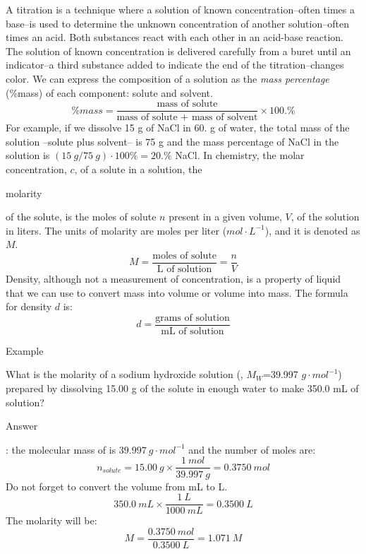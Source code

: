 \documentclass[main.tex]{subfiles}
\begin{document}
\vspace{0.2cm}{\large \bfseries Background}
A titration is a technique where a solution of known concentration--often times a base--is used to determine the unknown concentration of another solution--often times an acid. Both substances react with each other in an acid-base reaction. The solution of known concentration is delivered carefully from a buret until an indicator--a third substance added to indicate the end of the titration--changes color. 
We can express the composition of a solution as the \textit{mass percentage} (\%mass) of each component: solute and solvent.
\[\%mass=\frac{\text{mass of solute}}{\text{mass of solute + mass of solvent}}\times 100.\% \]
For example, if we dissolve 15 g of NaCl in 60. g of water, the total mass of the solution --solute plus solvent-- is 75 g and the mass percentage of NaCl in the solution is $(15\:g/75\:g) \cdot 100\%= 20.\%$ NaCl. 
In chemistry, the molar concentration, $c$, of a solute in a solution, the \begin{it}molarity\end{it} of the solute, is the moles of solute $n$ present in a given volume, $V$, of the solution in liters. The units of molarity are moles per liter ($mol\cdot L^{-1}$), and it is denoted as $M$.
\[M=\frac{\text{moles of solute}}{\text{L of solution}}=\frac{n}{V}\]
Density, although not a measurement of concentration, is a property of liquid that we can use to convert mass into volume or volume into mass. The formula for density $d$ is:
\[d=\frac{\text{grams of solution}}{\text{mL of solution}}\]
\begin{center}\begin{example}{Example}
\begin{it}
What is the molarity of a sodium hydroxide solution (, $M_W$=39.997 $g\cdot mol^{-1}$) prepared by dissolving 15.00 g of the solute in enough water to make 350.0 mL of solution?
\end{it}
\Sepline
\begin{bf}Answer\end{bf}: the molecular mass of  is $39.997\:g\cdot mol^{-1}$ and the number of  moles are:
\[n_{solute}=15.00\:g\times \frac{1\:mol}{39.997\:g}=0.3750\:mol\]
Do not forget to convert the volume from mL to L.
\[350.0\:mL \times \frac{1\:L}{1000\:mL}=0.3500\:L\]
The molarity will be:
\[M=\frac{0.3750\:mol}{0.3500\:L}=1.071\:M\]
\end{example}\end{center}
\end{document}
